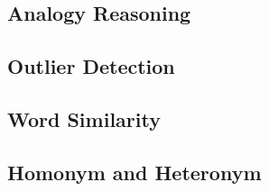 
\subsection{Analogy Reasoning} \label{sec:analogy}


\subsection{Outlier Detection} \label{sec:outlier}


\subsection{Word Similarity} \label{sec:similarity}


\subsection{Homonym and Heteronym} \label{sec:homonym_heteronym}

